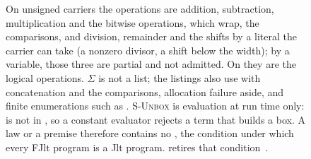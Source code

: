 \begin{figure}[htbp]
{On unsigned carriers the operations are addition, subtraction, multiplication and the bitwise operations, which wrap, the comparisons, and division, remainder and the shifts by a literal the carrier can take (a nonzero divisor, a shift below the width); by a variable, those three are partial and not admitted.
On  they are the logical operations.
$\Sigma$ is not a list; the listings also use  with concatenation and the comparisons, allocation failure aside, and finite enumerations such as .
\textsc{S-Unbox} is evaluation at run time only:  is not  in , so a constant evaluator rejects a term that builds a box.
A law or a  premise therefore contains no , the condition under which every FJlt program is a Jlt program.
 retires that condition~\cite{keir2025constexprsharedptr}.}
\label{fig:fjlt-eval}
\end{figure}

